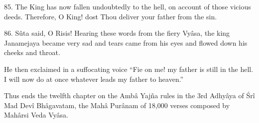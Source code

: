 85. The King has now fallen undoubtedly to the hell, on account of those vicious deeds. Therefore, O King! dost Thou deliver your father from the sin.

86. Sûta said, O Risis! Hearing these words from the fiery Vy\^asa, the king Janamejaya became very sad and tears came from his eyes and flowed down his cheeks and throat.

He then exclaimed in a suffocating voice ``Fie on me! my father is still in the hell. I will now do at once whatever leads my father to heaven.''

Thus ends the twelfth chapter on the Amb\^a Yaj\~na rules in the 3rd Adhy\^aya of \'Sr\^i Mad Dev\^i Bh\^agavatam, the Mah\^a Pur\^anam of 18,000 verses composed by Mah\^arsi Veda Vy\^asa.